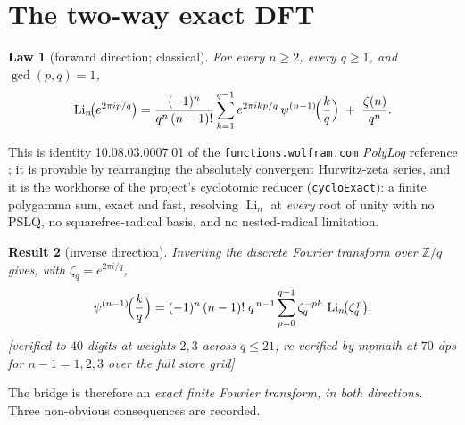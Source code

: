\documentclass[11pt]{article}
\newtheorem{result}{Result}[section]
\newtheorem{law}[result]{Law}
\theoremstyle{remark}
\newcommand{\Li}{\operatorname{Li}}
\newcommand{\dps}[1]{\textsf{\footnotesize[#1]}}
\begin{document}
\section{The two-way exact DFT}\label{sec:dft}

\begin{law}[forward direction; classical]\label{law:forward}
For every $n\ge2$, every $q\ge1$, and $\gcd(p,q)=1$,
\[
\Li_n\!\bigl(e^{2\pi ip/q}\bigr)
=\frac{(-1)^n}{q^n\,(n-1)!}\sum_{k=1}^{q-1}e^{2\pi ikp/q}\,
\psi^{(n-1)}\!\Bigl(\frac{k}{q}\Bigr)\;+\;\frac{\zeta(n)}{q^n}.
\]
\end{law}

This is identity 10.08.03.0007.01 of the \texttt{functions.wolfram.com} \emph{PolyLog}
reference \cite{WolframFunctions}; it is provable by rearranging the absolutely convergent Hurwitz-zeta series, and
it is the workhorse of the project's cyclotomic reducer (\texttt{cycloExact}): a finite
polygamma sum, exact and fast, resolving $\Li_n$ at \emph{every} root of unity with no
PSLQ, no squarefree-radical basis, and no nested-radical limitation.

\begin{result}[inverse direction]\label{res:inverse}
Inverting the discrete Fourier transform over $\mathbb{Z}/q$ gives, with
$\zeta_q=e^{2\pi i/q}$,
\[
\psi^{(n-1)}\!\Bigl(\frac{k}{q}\Bigr)
=(-1)^n\,(n-1)!\;q^{\,n-1}\sum_{p=0}^{q-1}\zeta_q^{-pk}\,\Li_n\!\bigl(\zeta_q^{\,p}\bigr).
\]
\dps{verified to $40$ digits at weights $2,3$ across $q\le21$; re-verified by mpmath at
$70$ dps for $n-1=1,2,3$ over the full store grid}
\end{result}

The bridge is therefore an \emph{exact finite Fourier transform, in both directions}.
Three non-obvious consequences are recorded.
\end{document}
